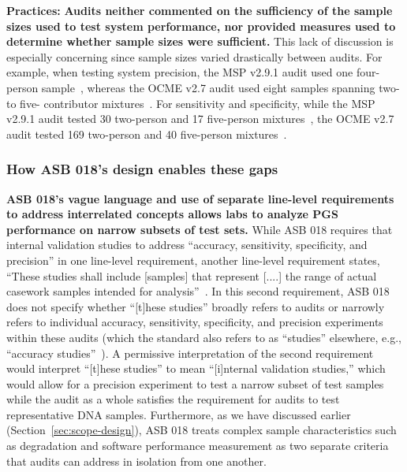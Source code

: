 \textbf{Practices:} \textbf{Audits neither commented on the sufficiency of the sample sizes used to test system performance, nor provided measures used to determine whether sample sizes were sufficient.} This lack of discussion is especially concerning since sample sizes varied drastically between audits. For example, when testing system precision, the MSP v2.9.1 audit used one four-person sample~\cite[p.65]{mspIV}, whereas the OCME v2.7 audit used eight samples spanning two- to five- contributor mixtures~\cite[p.28]{ocmeIV2.7}. For sensitivity and specificity, while the MSP v2.9.1 audit tested 30 two-person and 17 five-person mixtures~\cite[p.14-15]{mspIV}, the OCME v2.7 audit tested 169 two-person and 40 five-person mixtures~\cite[p.15]{ocmeIV2.7}. 


\subsubsection{How ASB 018's design enables these gaps}
\label{sec:performance-design}
\textbf{ASB 018's vague language and use of separate line-level requirements to address interrelated concepts allows labs to analyze PGS performance on narrow subsets of test sets.} While ASB 018 requires that internal validation studies to address ``accuracy, sensitivity, specificity, and precision'' in one line-level requirement, another line-level requirement states, ``These studies shall include [samples] that represent [....] the range of actual casework samples intended for analysis''~\cite[R4.1.3]{asb018}. In this second requirement, ASB 018 does not specify whether ``[t]hese studies'' broadly refers to audits or narrowly refers to individual accuracy, sensitivity, specificity, and precision experiments within these audits (which the standard also refers to as ``studies'' elsewhere, e.g., ``accuracy studies''~\cite[p.1]{asb018}). A permissive interpretation of the second requirement would interpret ``[t]hese studies'' to mean ``[i]nternal validation studies,'' which would allow for a precision experiment to test a narrow subset of test samples while the audit as a whole satisfies the requirement for audits to test representative DNA samples. Furthermore, as we have discussed earlier (Section~\ref{sec:scope-design}), ASB 018 treats complex sample characteristics such as degradation and software performance measurement as two separate criteria that audits can address in isolation from one another. 


